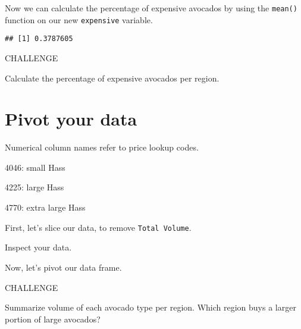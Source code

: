 \documentclass[]{book}
\newenvironment{Shaded}{\begin{snugshade}}{\end{snugshade}}
\newcommand{\DataTypeTok}[1]{\textcolor[rgb]{0.13,0.29,0.53}{#1}}
\newcommand{\KeywordTok}[1]{\textcolor[rgb]{0.13,0.29,0.53}{\textbf{#1}}}
\newcommand{\NormalTok}[1]{#1}
\newcommand{\OperatorTok}[1]{\textcolor[rgb]{0.81,0.36,0.00}{\textbf{#1}}}
\newcommand{\StringTok}[1]{\textcolor[rgb]{0.31,0.60,0.02}{#1}}
\begin{document}
Now we can calculate the percentage of expensive avocados by using the \texttt{mean()} function on our new \texttt{expensive} variable.

\begin{Shaded}
\end{Shaded}

\begin{verbatim}
## [1] 0.3787605
\end{verbatim}

\leavevmode\hypertarget{challenge}{}%
CHALLENGE

Calculate the percentage of expensive avocados per region.

\hypertarget{pivot-your-data}{%
\section{Pivot your data}\label{pivot-your-data}}

Numerical column names refer to price lookup codes.

4046: small Hass

4225: large Hass

4770: extra large Hass

First, let's slice our data, to remove \texttt{Total\ Volume}.

\begin{Shaded}
\end{Shaded}

Inspect your data.

Now, let's pivot our data frame.

\begin{Shaded}
\end{Shaded}

\leavevmode\hypertarget{challenge}{}%
CHALLENGE

Summarize volume of each avocado type per region. Which region buys a larger portion of large avocados?


\end{document}
